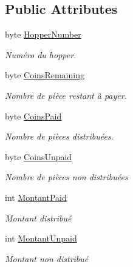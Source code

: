 \subsection*{Public Attributes}
\begin{DoxyCompactItemize}
\item 
byte \mbox{\hyperlink{class_device_library_1_1_c_hopper_1_1_c_hopper_status_1_1_c_dispensed_result_aea7d1e629abb83dbd02478d04547278d}{Hopper\+Number}}
\begin{DoxyCompactList}\small\item\em Numéro du hopper. \end{DoxyCompactList}\item 
byte \mbox{\hyperlink{class_device_library_1_1_c_hopper_1_1_c_hopper_status_1_1_c_dispensed_result_a2eac4efe6ef793ea361f0f2c5baf5326}{Coins\+Remaining}}
\begin{DoxyCompactList}\small\item\em Nombre de pièce restant à payer. \end{DoxyCompactList}\item 
byte \mbox{\hyperlink{class_device_library_1_1_c_hopper_1_1_c_hopper_status_1_1_c_dispensed_result_a8266bc3a0c5a4c268d57f5ed83d0882f}{Coins\+Paid}}
\begin{DoxyCompactList}\small\item\em Nombre de pièces distribuées. \end{DoxyCompactList}\item 
byte \mbox{\hyperlink{class_device_library_1_1_c_hopper_1_1_c_hopper_status_1_1_c_dispensed_result_a2a472fae256a38b6fa595a8a2047a4c6}{Coins\+Unpaid}}
\begin{DoxyCompactList}\small\item\em Nombre de pièces non distribuées \end{DoxyCompactList}\item 
int \mbox{\hyperlink{class_device_library_1_1_c_hopper_1_1_c_hopper_status_1_1_c_dispensed_result_a575da9fcadfa091789d482ce63a10d6f}{Montant\+Paid}}
\begin{DoxyCompactList}\small\item\em Montant distribué \end{DoxyCompactList}\item 
int \mbox{\hyperlink{class_device_library_1_1_c_hopper_1_1_c_hopper_status_1_1_c_dispensed_result_a0c4e306c0e2bfd89d578c4de56978f70}{Montant\+Unpaid}}
\begin{DoxyCompactList}\small\item\em Montant non distribué \end{DoxyCompactList}\item 

\end{DoxyCompactItemize}
